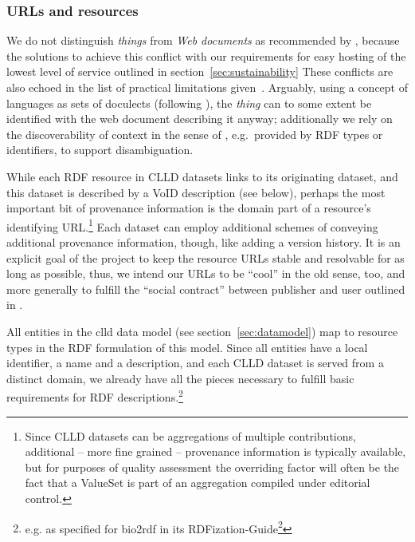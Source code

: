 \documentclass[a4paper,10pt]{article}
\begin{document}

\subsubsection{URLs and resources}
We do not distinguish \emph{things} from \emph{Web documents} as recommended by ,
because the solutions to achieve this conflict with our requirements for easy hosting of the lowest level
of service outlined in section~\ref{sec:sustainability}
These conflicts are also echoed in the list of practical limitations given~.
Arguably, using a concept of languages as sets of doculects (following ), the \emph{thing} can
to some extent be identified with the web document describing it anyway;
additionally we rely on the discoverability of context in the sense of ,
e.g.~provided by RDF types or identifiers, to support disambiguation.

While each RDF resource in CLLD datasets links to its originating
dataset, and this dataset is described by a VoID description (see below), perhaps the most
important bit of provenance information is the domain part of
a resource's identifying URL.\footnote{Since CLLD datasets can be aggregations of multiple
contributions, additional -- more fine grained -- provenance information is typically available,
but for purposes of quality assessment the overriding factor will often be the fact that a
ValueSet is part of an aggregation compiled under editorial control.} Each dataset can employ
additional schemes of conveying additional provenance information, though, like adding a version history.
It is an explicit goal of the project to keep the resource URLs stable and resolvable for
as long as possible, thus, we intend our URLs to be ``cool'' in the old sense, too, and more
generally to fulfill the ``social contract'' between publisher and user outlined in .

All entities in the clld data model (see section~\ref{sec:datamodel}) map to resource types
in the RDF formulation of this model. Since all entities have a local identifier, a name
and a description, and each CLLD dataset is served from a distinct domain,
we already have all the pieces necessary to fulfill basic requirements for RDF
descriptions.\footnote{e.g. as specified for bio2rdf in its
RDFization-Guide\footnote{https://github.com/bio2rdf/bio2rdf-scripts/wiki/RDFization-Guide}}
\end{document}
